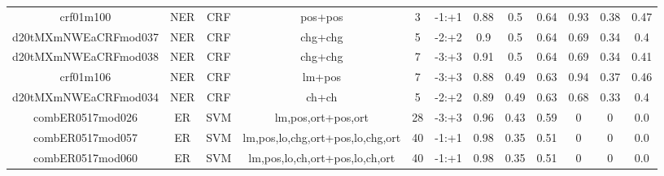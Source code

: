 \documentclass[a4paper]{article}
\begin{document}
\begin{landscape}
\begin{center}
\begin{tabular}{ |c|c|c|c|c|c|c|c|c|c|c|c|}
 	
 
 	
 		
 		\small{ crf01m100 } & NER & CRF & pos+pos  &  3 &  -1:+1  &  0.88 & 0.5 & 0.64  &  0.93 & 0.38 & 0.47 \\
 		

 	
 
 	
 		
 		\small{ d20tMXmNWEaCRFmod037 } & NER & CRF & chg+chg  &  5 &  -2:+2  &  0.9 & 0.5 & 0.64  &  0.69 & 0.34 & 0.4 \\
 		

 	
 
 	
 		
 		\small{ d20tMXmNWEaCRFmod038 } & NER & CRF & chg+chg  &  7 &  -3:+3  &  0.91 & 0.5 & 0.64  &  0.69 & 0.34 & 0.41 \\
 		

 	
 
 	
 		
 		\small{ crf01m106 } & NER & CRF & lm+pos  &  7 &  -3:+3  &  0.88 & 0.49 & 0.63  &  0.94 & 0.37 & 0.46 \\
 		

 	
 
 	
 		
 		\small{ d20tMXmNWEaCRFmod034 } & NER & CRF & ch+ch  &  5 &  -2:+2  &  0.89 & 0.49 & 0.63  &  0.68 & 0.33 & 0.4 \\
 		

 	
 
 	
 		
 		\small{ combER0517mod026 } & ER & SVM & lm,pos,ort+pos,ort  &  28 &  -3:+3  &  0.96 & 0.43 & 0.59  &  0 & 0 & 0.0 \\
 		

 	
 
 	
 		
 		\small{ combER0517mod057 } & ER & SVM & lm,pos,lo,chg,ort+pos,lo,chg,ort  &  40 &  -1:+1  &  0.98 & 0.35 & 0.51  &  0 & 0 & 0.0 \\
 		

 	
 
 	
 		
 		\small{ combER0517mod060 } & ER & SVM & lm,pos,lo,ch,ort+pos,lo,ch,ort  &  40 &  -1:+1  &  0.98 & 0.35 & 0.51  &  0 & 0 & 0.0 \\
 		

 	
 
 	
 
 	
 
 	
 
 	
 
 	
 

\end{tabular}
\end{center}
\end{landscape}
\end{document}
